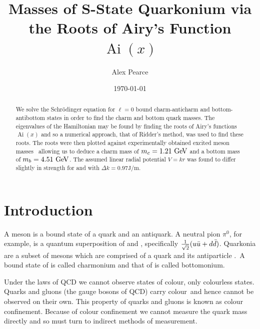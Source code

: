 \documentclass[]{article}
\newcommand{\Ai}[1]{\ensuremath{\operatorname{Ai}({#1})}}
\begin{document}
\title{Masses of S-State Quarkonium via the Roots of Airy's Function $\Ai{x}$}
\author{Alex Pearce}
\date{\today}
\maketitle


\begin{abstract}
We solve the Schr\"{o}dinger equation for $\ell = 0$ bound charm-anticharm \ccbar and bottom-antibottom \bbbar states in order to find the charm and bottom quark masses. The eigenvalues of the Hamiltonian may be found by finding the roots of Airy's functions $\Ai{x}$ and so a numerical approach, that of Ridder's method, was used to find these roots. The roots were then plotted against experimentally obtained excited meson masses~\cite{ref:gdaniell} allowing us to deduce a charm mass of $m_{c} = 1.21\GeV$ and a bottom mass of $m_{b} = 4.51\GeV$. The assumed linear radial potential $V = kr$ was found to differ slightly in strength for \ccbar and \bbbar with $\Delta k = 0.97\si{\joule\per\metre}$.
\end{abstract}


\section{Introduction}\label{sec:intro}

A meson is a bound state of a quark and an antiquark. A neutral pion $\pi^{0}$, for example, is a quantum superposition of \uubar and \ddbar, specifically $\frac{1}{\sqrt{2}}(u\bar{u} + d\bar{d})$. Quarkonia are a subset of mesons which are comprised of a quark and its antiparticle \qqbar.\footnotemark\ A bound state of \ccbar is called charmonium and that of \bbbar is called bottomonium.


Under the laws of QCD we cannot observe states of colour, only colourless states. Quarks and gluons (the gauge bosons of QCD) carry colour\footnotemark\ and hence cannot be observed on their own. This property of quarks and gluons is known as colour confinement. Because of colour confinement we cannot measure the quark mass directly and so must turn to indirect methods of measurement.
\end{document}
